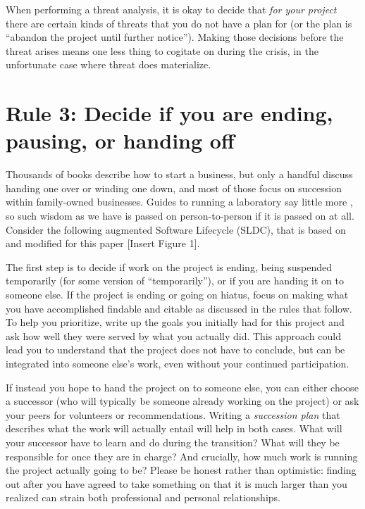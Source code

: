 \documentclass[10pt,letterpaper]{article}
\begin{document}
When performing a threat analysis,
it is okay to decide that \emph{for your project} there are certain kinds of threats that you do not have a plan for (or the plan is ``abandon the project until further notice'').
Making those decisions before the threat arises means one less thing to cogitate on during the crisis,
in the unfortunate case where threat does materialize.

\section*{Rule 3: Decide if you are ending, pausing, or handing off}

Thousands of books describe how to start a business,
but only a handful discuss handing one over or winding one down,
and most of those focus on succession within family-owned businesses.
Guides to running a laboratory say little more \cite{Barker2010,Cohen2018},
so such wisdom as we have is passed on person-to-person if it is passed on at all.
Consider the following augmented Software Lifecycle (SLDC), that is based on~\cite{deRSE25} and modified for this paper [Insert Figure 1].

The first step is to decide if work on the project is ending,
being suspended temporarily (for some version of ``temporarily''),
or if you are handing it on to someone else.
If the project is ending or going on hiatus,
focus on making what you have accomplished findable and citable
as discussed in the rules that follow.
To help you prioritize,
write up the goals you initially had for this project
and ask how well they were served by what you actually did.
This approach could lead you to understand that the project does not have to conclude,
but can be integrated into someone else's work,
even without your continued participation.

If instead you hope to hand the project on to someone else,
you can either choose a successor
(who will typically be someone already working on the project)
or ask your peers for volunteers or recommendations.
Writing a \emph{succession plan} that describes what the work will actually entail
will help in both cases.
What will your successor have to learn and do during the transition?
What will they be responsible for once they are in charge?
And crucially,
how much work is running the project actually going to be?
Please be honest rather than optimistic:
finding out after you have agreed to take something on
that it is much larger than you realized
can strain both professional and personal relationships.
\end{document}
